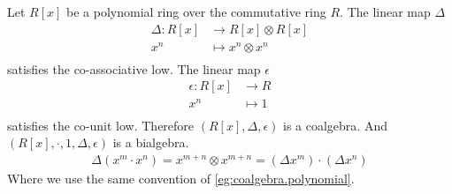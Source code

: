 \begin{example}
Let $R[x]$ be a polynomial ring over the commutative ring $R$. 
The linear map $\Delta$
\begin{equation}\begin{split}
	\Delta: R[x] &\to R[x] \otimes R[x] \\
		x^n &\mapsto x^n \otimes x^n \\
\end{split}\end{equation}
satisfies the co-associative low. The linear map $\epsilon$
\begin{equation}\begin{split}
	\epsilon: R[x] &\to R \\
		x^n &\mapsto 1 \\
\end{split}\end{equation}
satisfies the co-unit low. Therefore $(R[x], \Delta, \epsilon)$ is 
a coalgebra. And $(R[x], \cdot, 1, \Delta, \epsilon)$ is a bialgebra.
\begin{equation}\begin{split}
	\Delta(x^m \cdot x^n) = x^{m+n} \otimes x^{m+n}
		= (\Delta x^m) \cdot (\Delta x^n)
\end{split}\end{equation}
Where we use the same convention of \ref{eg:coalgebra.polynomial}.
\end{example}
